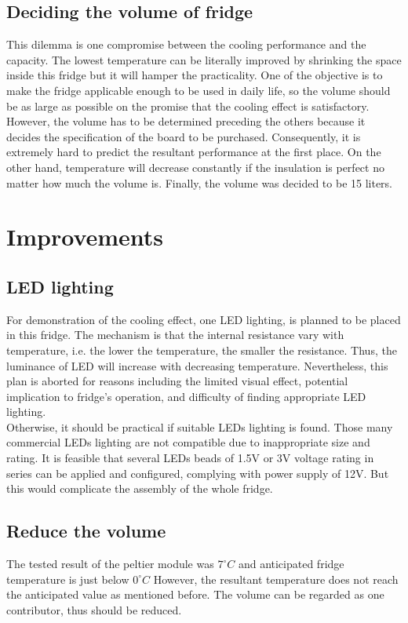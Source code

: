\documentclass[12pt,onecolumn]{article}
\begin{document}
\subsection{Deciding the volume of fridge}
This dilemma is one compromise between the cooling performance and the capacity. The lowest temperature can be literally improved by shrinking the space inside this fridge but it will hamper the practicality. One of the objective is to make the fridge applicable enough to be used in daily life, so the volume should be as large as possible on the promise that the cooling effect is satisfactory. \\
However, the volume has to be determined preceding the others because it decides the specification of the board to be purchased. Consequently, it is extremely hard to predict the resultant performance at the first place. On the other hand, temperature will decrease constantly if the insulation is perfect no matter how much the volume is. Finally, the volume was decided to be 15 liters. \\

\section{Improvements}
\subsection{LED lighting}
For demonstration of the cooling effect, one LED lighting, is planned to be placed in this fridge. The mechanism is that the internal resistance vary with temperature, i.e. the lower the temperature, the smaller the resistance. Thus, the luminance of LED will increase with decreasing temperature. Nevertheless, this plan is aborted for reasons including the limited visual effect, potential implication to fridge’s operation, and difficulty of finding appropriate LED lighting. \\
Otherwise, it should be practical if suitable LEDs lighting is found. Those many commercial LEDs lighting are not compatible due to inappropriate size and rating. It is feasible that several LEDs beads of 1.5V or 3V voltage rating in series can be applied and configured, complying with power supply of 12V. But this would complicate the assembly of the whole fridge.
\subsection{Reduce the volume}
The tested result of the peltier module was $7^{\circ}C$ and anticipated fridge temperature is just below $0^{\circ}C$ However, the resultant temperature does not reach the anticipated value as mentioned before. The volume can be regarded as one contributor, thus should be reduced.
\end{document}
